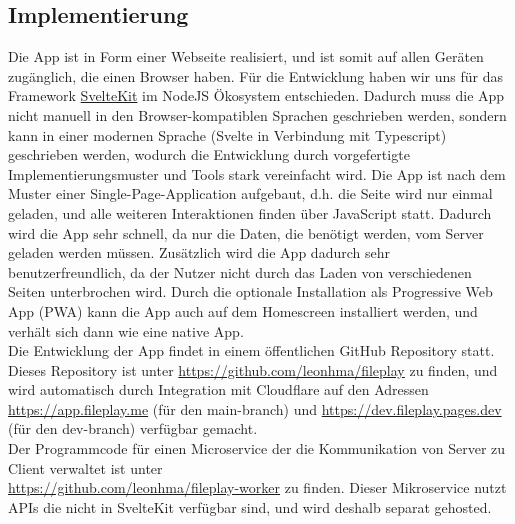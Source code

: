 \documentclass[a4paper]{article}
\begin{document}
\subsection{Implementierung}
Die App ist in Form einer Webseite realisiert, und ist somit auf allen Geräten
zugänglich, die einen Browser haben. Für die Entwicklung haben wir uns für das
Framework \href{https://kit.svelte.dev/}{SvelteKit} im NodeJS Ökosystem
entschieden. Dadurch muss die App nicht manuell in den Browser-kompatiblen
Sprachen geschrieben werden, sondern kann in einer modernen Sprache (Svelte in
Verbindung mit Typescript) geschrieben werden, wodurch die Entwicklung durch
vorgefertigte Implementierungsmuster und Tools stark vereinfacht wird. Die App
ist nach dem Muster einer Single-Page-Application aufgebaut, d.h. die Seite wird
nur einmal geladen, und alle weiteren Interaktionen finden über JavaScript
statt. Dadurch wird die App sehr schnell, da nur die Daten, die benötigt werden,
vom Server geladen werden müssen. Zusätzlich wird die App dadurch sehr
benutzerfreundlich, da der Nutzer nicht durch das Laden von verschiedenen Seiten
unterbrochen wird. Durch die optionale Installation als Progressive Web App
(PWA) kann die App auch auf dem Homescreen installiert werden, und verhält sich
dann wie eine native App.\\
Die Entwicklung der App findet in einem öffentlichen GitHub Repository statt.
Dieses Repository ist unter \url{https://github.com/leonhma/fileplay} zu finden,
und wird automatisch durch Integration mit Cloudflare auf den Adressen
\url{https://app.fileplay.me} (für den {main}-branch) und
\url{https://dev.fileplay.pages.dev} (für den {dev}-branch) verfügbar gemacht.\\
Der Programmcode für einen Microservice der die Kommunikation von Server zu
Client verwaltet ist unter \\\url{https://github.com/leonhma/fileplay-worker} zu
finden. Dieser Mikroservice nutzt APIs die nicht in SvelteKit verfügbar sind,
und wird deshalb separat gehosted.
\end{document}
